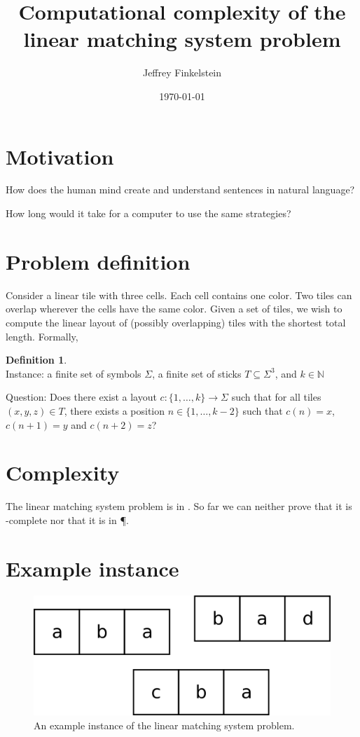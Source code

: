 \documentclass{lposter}
\title{Computational complexity of the linear matching system problem}
\author{Jeffrey Finkelstein}
\date{\today}
\theoremstyle{definition} \newtheorem*{definition}{Definition}
\begin{document}
\begin{poster}

\section{Motivation}

How does the human mind create and understand sentences in natural language?

How long would it take for a computer to use the same strategies?

\section{Problem definition}

Consider a linear tile with three cells. Each cell contains one color. Two
tiles can overlap wherever the cells have the same color. Given a set of tiles,
we wish to compute the linear layout of (possibly overlapping) tiles with the
shortest total length. Formally,

\begin{shaded}
\begin{definition}\mbox{}\\
  Instance: a finite set of symbols $\Sigma$, a finite set of sticks
  $T\subseteq\Sigma^3$, and $k\in\mathbb{N}$

  Question: Does there exist a layout $c\colon\{1,\ldots,k\}\to\Sigma$ such
  that for all tiles $(x, y, z)\in T$, there exists a position
  $n\in\{1,\ldots,k-2\}$ such that $c(n)=x$, $c(n+1)=y$ and $c(n+2)=z$?
\end{definition}
\end{shaded}

\section{Complexity}

The linear matching system problem is in \NP. So far we can neither prove that
it is \NP-complete nor that it is in \P.

\columnbreak

\section{Example instance}

\begin{figure}
  \caption{An example instance of the linear matching system problem.}
  \includegraphics{example-instance}
\end{figure}


\end{poster}
\end{document}
